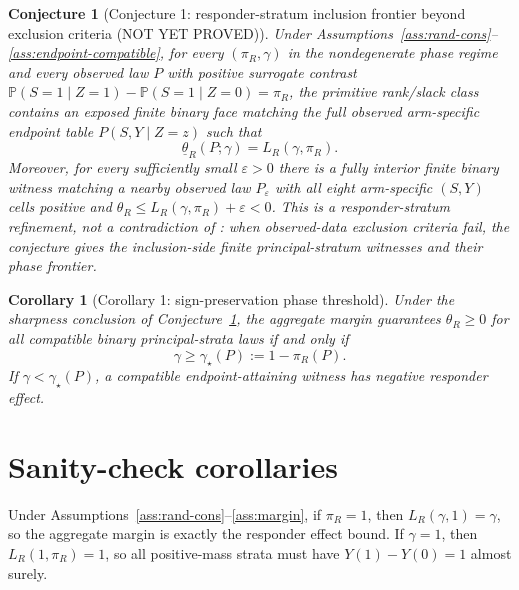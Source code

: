 \documentclass[11pt]{article}
\renewcommand{\Pr}{\mathbb{P}}
\theoremstyle{definition}
\theoremstyle{plain}
\newtheorem{conjecture}{Conjecture}
\newtheorem{corollary}{Corollary}
\theoremstyle{remark}
\begin{document}
\begin{conjecture}[Conjecture 1: responder-stratum inclusion frontier beyond exclusion criteria (NOT YET PROVED)]\label{conj:sharp-frontier}
Under Assumptions~\ref{ass:rand-cons}--\ref{ass:endpoint-compatible}, for every \((\pi_R,\gamma)\) in the nondegenerate phase regime and every observed law \(P\) with positive surrogate contrast \(\Pr(S=1\mid Z=1)-\Pr(S=1\mid Z=0)=\pi_R\), the primitive rank/slack class contains an exposed finite binary face matching the full observed arm-specific endpoint table \(P(S,Y\mid Z=z)\) such that
\[
  \underline\theta_R(P;\gamma)=L_R(\gamma,\pi_R).
\]
Moreover, for every sufficiently small \(\varepsilon>0\) there is a fully interior finite binary witness matching a nearby observed law \(P_\varepsilon\) with all eight arm-specific \((S,Y)\) cells positive and \(\theta_R\le L_R(\gamma,\pi_R)+\varepsilon<0\).  This is a responder-stratum refinement, not a contradiction of \citet{YinLiuGengLuo2020}: when observed-data exclusion criteria fail, the conjecture gives the inclusion-side finite principal-stratum witnesses and their phase frontier.
\end{conjecture}

\begin{corollary}[Corollary 1: sign-preservation phase threshold]\label{cor:threshold}
Under the sharpness conclusion of Conjecture~\ref{conj:sharp-frontier}, the aggregate margin guarantees \(\theta_R\ge0\) for all compatible binary principal-strata laws if and only if
\[
  \gamma\ge \gamma_\star(P):=1-\pi_R(P).
\]
If \(\gamma<\gamma_\star(P)\), a compatible endpoint-attaining witness has negative responder effect.
\end{corollary}

\section{Sanity-check corollaries}
Under Assumptions~\ref{ass:rand-cons}--\ref{ass:margin}, if \(\pi_R=1\), then \(L_R(\gamma,1)=\gamma\), so the aggregate margin is exactly the responder effect bound.  If \(\gamma=1\), then \(L_R(1,\pi_R)=1\), so all positive-mass strata must have \(Y(1)-Y(0)=1\) almost surely.
\end{document}
